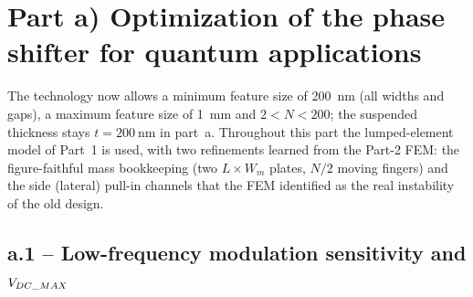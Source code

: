 \section{Part a) Optimization of the phase shifter for quantum applications}

The technology now allows a minimum feature size of \SI{200}{\nano\meter}
(all widths and gaps), a maximum feature size of \SI{1}{\milli\meter} and
$2<N<200$; the suspended thickness stays $t=\SI{200}{\nano\meter}$ in part~a.
Throughout this part the lumped-element model of Part~1 is used, with two
refinements learned from the Part-2 FEM: the figure-faithful mass bookkeeping
(two $L\times W_{m}$ plates, $N/2$ moving fingers) and the side
(lateral) pull-in channels that the FEM identified as the real instability of
the old design.

\subsection*{a.1 -- Low-frequency modulation sensitivity and $V_{DC\_MAX}$}


